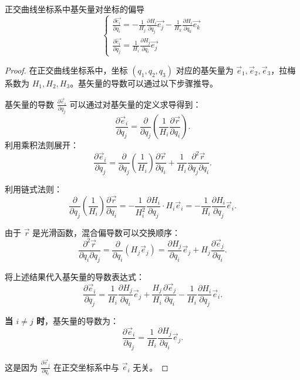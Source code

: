 \documentclass[12pt, a4paper, oneside, UTF8]{ctexbook}  %
\newcommand{\pa}{\partial}
\begin{document}
\begin{proposition}
    正交曲线坐标系中基矢量对坐标的偏导
    \[\begin{cases}
        \frac{\pa \vec{e_i}}{\pa q_i}=-\frac{1}{H_j}\frac{\pa H_i}{\pa q_j}\vec{e_j}
        -\frac{1}{H_k}\frac{\pa H_i}{\pa q_k}\vec{e_k}\\
        \frac{\pa\vec{e_i}}{\pa q_j}=\frac{1}{H_i}\frac{\pa H_j}{\pa q_i}\vec{e_j}
    \end{cases}\]
\begin{proof}
    在正交曲线坐标系中，坐标 \( (q_1, q_2, q_3) \) 对应的基矢量为 \( \vec{e}_1, \vec{e}_2, \vec{e}_3 \)，拉梅系数为 \( H_1, H_2, H_3 \)。基矢量的导数可以通过以下步骤推导。

    基矢量的导数 \( \frac{\partial \vec{e}_i}{\partial q_j} \) 可以通过对基矢量的定义求导得到：
    \[
    \frac{\partial \vec{e}_i}{\partial q_j} = \frac{\partial}{\partial q_j} \left( \frac{1}{H_i} \frac{\partial \vec{r}}{\partial q_i} \right).
    \]
    利用乘积法则展开：
    \[
    \frac{\partial \vec{e}_i}{\partial q_j} = \frac{\partial}{\partial q_j} \left( \frac{1}{H_i} \right) \frac{\partial \vec{r}}{\partial q_i} + \frac{1}{H_i} \frac{\partial^2 \vec{r}}{\partial q_j \partial q_i}.
    \]
    
    利用链式法则：
    \[
    \frac{\partial}{\partial q_j} \left( \frac{1}{H_i} \right) \frac{\partial \vec{r}}{\partial q_i} = -\frac{1}{H_i^2} \frac{\partial H_i}{\partial q_j} \cdot H_i \vec{e}_i = -\frac{1}{H_i} \frac{\partial H_i}{\partial q_j} \vec{e}_i.
    \]
    
    由于 \( \vec{r} \) 是光滑函数，混合偏导数可以交换顺序：
    \[
    \frac{\partial^2 \vec{r}}{\partial q_i \partial q_j} = \frac{\partial}{\partial q_i} \left( H_j \vec{e}_j \right) = \frac{\partial H_j}{\partial q_i} \vec{e}_j + H_j \frac{\partial \vec{e}_j}{\partial q_i}.
    \]
    
    将上述结果代入基矢量的导数表达式：
    \[
    \frac{\partial \vec{e}_i}{\partial q_j} = \frac{1}{H_i} \frac{\partial H_j}{\partial q_i} \vec{e}_j + \frac{H_j}{H_i} \frac{\partial \vec{e}_j}{\partial q_i} - \frac{1}{H_i} \frac{\partial H_i}{\partial q_j} \vec{e}_i.
    \]
    
    \textbf{当 \( i \neq j \) 时}，基矢量的导数为：
    \[
    \frac{\partial \vec{e}_i}{\partial q_j} = \frac{1}{H_i} \frac{\partial H_j}{\partial q_i} \vec{e}_j.
    \]

    这是因为 \( \frac{\partial \vec{e}_j}{\partial q_i} \) 在正交坐标系中与 \( \vec{e}_i \) 无关。
    

\end{proof}
\end{proposition}
\end{document}
